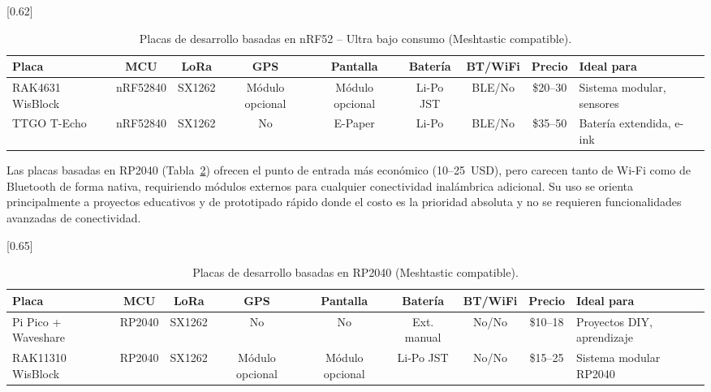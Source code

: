 \begin{table}[H]
\begin{center}
\caption{Placas de desarrollo basadas en nRF52 -- Ultra bajo consumo (Meshtastic compatible).}
\scalebox{0.62}[0.62]{
\begin{tabular}{| l | c | c | c | c | c | c | c | l |}
\hline
 \textbf{Placa} & \textbf{MCU} & \textbf{LoRa} & \textbf{GPS} & \textbf{Pantalla} & \textbf{Batería} & \textbf{BT/WiFi} & \textbf{Precio} & \textbf{Ideal para} \\
\hline
\hline
 RAK4631 WisBlock & nRF52840 & SX1262 & Módulo opcional & Módulo opcional & Li-Po JST & BLE/No & \$20--30 & Sistema modular, sensores \\
 TTGO T-Echo & nRF52840 & SX1262 & No & E-Paper & Li-Po & BLE/No & \$35--50 & Batería extendida, e-ink \\
\hline
\end{tabular}}
\label{tab:placas_nrf52}
\end{center}
\end{table}

Las placas basadas en RP2040 (Tabla~\ref{tab:placas_rp2040}) ofrecen el punto de entrada más económico (10--25~USD), pero carecen tanto de Wi-Fi como de Bluetooth de forma nativa, requiriendo módulos externos para cualquier conectividad inalámbrica adicional. Su uso se orienta principalmente a proyectos educativos y de prototipado rápido donde el costo es la prioridad absoluta y no se requieren funcionalidades avanzadas de conectividad.

\begin{table}[H]
\begin{center}
\caption{Placas de desarrollo basadas en RP2040 (Meshtastic compatible).}
\scalebox{0.65}[0.65]{
\begin{tabular}{| l | c | c | c | c | c | c | c | l |}
\hline
 \textbf{Placa} & \textbf{MCU} & \textbf{LoRa} & \textbf{GPS} & \textbf{Pantalla} & \textbf{Batería} & \textbf{BT/WiFi} & \textbf{Precio} & \textbf{Ideal para} \\
\hline
\hline
 Pi Pico + Waveshare & RP2040 & SX1262 & No & No & Ext. manual & No/No & \$10--18 & Proyectos DIY, aprendizaje \\
 RAK11310 WisBlock & RP2040 & SX1262 & Módulo opcional & Módulo opcional & Li-Po JST & No/No & \$15--25 & Sistema modular RP2040 \\
\hline
\end{tabular}}
\label{tab:placas_rp2040}
\end{center}
\end{table}

